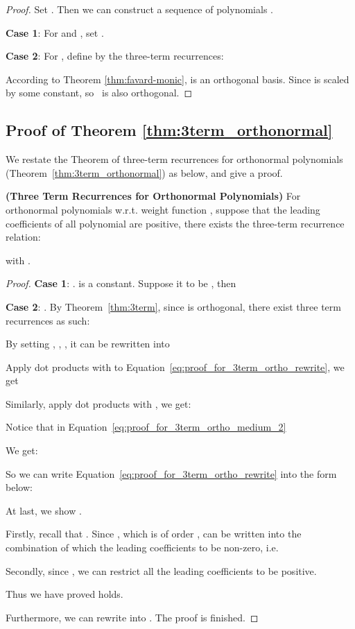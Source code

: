 \begin{proof}
  Set . Then we can construct a sequence of
  polynomials .
  
  \textbf{Case 1}: For  and , set  .
  
  \textbf{Case 2}:  For , define  by the three-term recurrences:
  
  According to Theorem \ref{thm:favard-monic},  is an
  orthogonal basis. Since  is scaled  by some constant, so
   \ is also orthogonal.
\end{proof}
 \subsection{Proof of Theorem \ref{thm:3term_orthonormal}}
\label{sec:proof-of-3term-orthonormal}
We restate the Theorem of three-term recurrences for orthonormal polynomials
(Theorem~\ref{thm:3term_orthonormal}) as below, and give a proof.

\textbf{(Three Term Recurrences for Orthonormal Polynomials)}
    For orthonormal polynomials  w.r.t. weight function , 
    suppose that the leading coefficients of all polynomial are positive, 
    there exists the three-term recurrence relation:
    
with .
    
\begin{proof}
      \textbf{Case 1}: .  is a constant. Suppose it to be , then
      
      \textbf{Case 2}: . By Theorem~\ref{thm:3term}, since  is
      orthogonal, there exist three term recurrences as such:
      
      By setting , ,
      , it can be rewritten into
      
      
Apply dot products with  to Equation~\eqref{eq:proof_for_3term_ortho_rewrite}, 
      we get
      
      Similarly, apply dot products with , we get:
      
      Notice that in Equation~\eqref{eq:proof_for_3term_ortho_medium_2}
      
      We get:
      
      
      So we can write Equation~\eqref{eq:proof_for_3term_ortho_rewrite} into the form below: \
      
      At last, we show .
      
      Firstly, recall that . Since , which
      is of order , can be written into the combination of  which the leading coefficients to be non-zero, i.e.
      
      Secondly, since , we can restrict all the leading coefficients to be positive.
      
      Thus we have proved  holds.
      
      Furthermore, we can rewrite  into . 
      The proof is finished.
    \end{proof}

